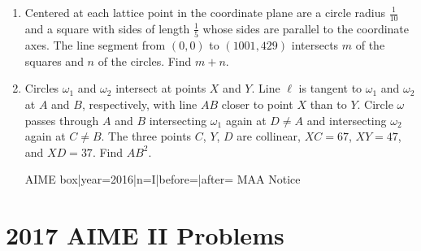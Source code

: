 \documentclass{article}
\begin{document}
\begin{enumerate}[label=\arabic*., itemsep=0.5em]
\vspace{0.5em}\item Centered at each lattice point in the coordinate plane are a circle radius \(\frac{1}{10}\) and a square with sides of length \(\frac{1}{5}\) whose sides are parallel to the coordinate axes. The line segment from \((0,0)\) to \((1001, 429)\) intersects \(m\) of the squares and \(n\) of the circles. Find \(m + n\).\par \vspace{0.5em}\item Circles \(\omega_1\) and \(\omega_2\) intersect at points \(X\) and \(Y\). Line \(\ell\) is tangent to \(\omega_1\) and \(\omega_2\) at \(A\) and \(B\), respectively, with line \(AB\) closer to point \(X\) than to \(Y\). Circle \(\omega\) passes through \(A\) and \(B\) intersecting \(\omega_1\) again at \(D \neq A\) and intersecting \(\omega_2\) again at \(C \neq B\). The three points \(C\), \(Y\), \(D\) are collinear, \(XC = 67\), \(XY = 47\), and \(XD = 37\). Find \(AB^2\).



{{AIME box|year=2016|n=I|before=|after=}}
{{MAA Notice}}\par \vspace{0.5em}\end{enumerate}\newpage\section*{2017 AIME II Problems}
\end{document}
